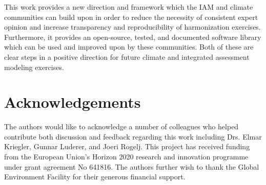 \documentclass[review]{elsarticle}
\begin{document}
This work provides a new direction and framework which the IAM and climate
communities can build upon in order to reduce the necessity of consistent expert
opinion and increase transparency and reproducibility of harmonization
exercises. Furthermore, it provides an open-source, tested, and documented
software library which can be used and improved upon by these communities. Both
of these are clear steps in a positive direction for future climate and
integrated assessment modeling exercises.

\section*{Acknowledgements}

The authors would like to acknowledge a number of colleagues who helped
contribute both discussion and feedback regarding this work including Drs. Elmar
Kriegler, Gunnar Luderer, and Joeri Rogelj. This project has received funding
from the European Union’s Horizon 2020 research and innovation programme under
grant agreement No 641816. The authors further wish to thank the Global
Environment Facility for their generous financial support.

\newpage
\printglossaries

\newpage
\section*{\refname}

\end{document}
